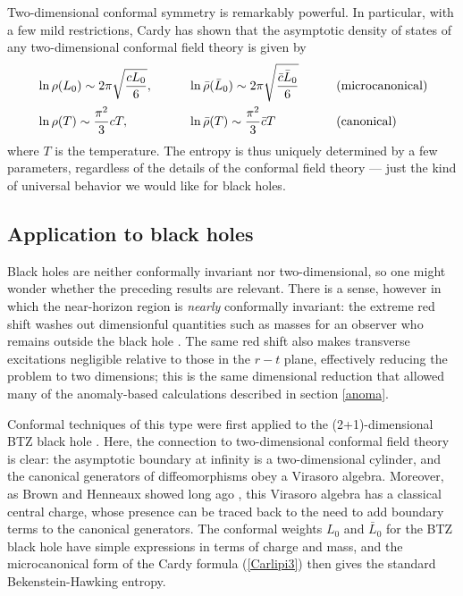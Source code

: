 \documentclass[12pt]{article}
\begin{document}
Two-dimensional conformal symmetry is remarkably powerful.  In particular,
with a few mild restrictions, Cardy has shown that the asymptotic density of
states of any two-dimensional conformal field theory is given by \cite{Cardy,Cardy2}
\begin{alignat}{5}
&\ln\rho(L_0) \sim 2\pi\sqrt{\frac{cL_0}{6}}, \qquad 
&&\ln{\bar\rho}({\bar L}_0) \sim 2\pi\sqrt{\frac{{\bar c}{\bar L}_0}{6}} \qquad
&&\hbox{(microcanonical)} \nonumber\\
&\ln\rho(T) \sim \frac{\pi^2}{3}cT, \qquad 
&&\ln{\bar\rho}(T) \sim \frac{\pi^2}{3}{\bar c}T
&&\hbox{(canonical)}
\label{Carlipi3}
\end{alignat}
where $T$ is the temperature.  The entropy is thus uniquely determined by a 
few parameters, regardless of the details of the conformal field theory --- just 
the kind of universal behavior we would like for black holes.

\subsection{Application to black holes}

Black holes are neither conformally invariant nor two-dimensional, so one
might wonder whether the preceding results are relevant. There is a sense,
however in which the near-horizon region is \emph{nearly}  conformally
 invariant: the extreme red shift washes out dimensionful quantities such
as masses for an observer who remains outside the black hole \cite{Camblong}.
The same red shift also makes transverse excitations negligible relative to 
those in the $r-t$ plane, effectively reducing the problem to two dimensions; 
this is the same dimensional reduction that allowed many of the anomaly-based
calculations described in section \ref{anoma}.

Conformal techniques of this type were first applied to the (2+1)-dimensional
BTZ black hole \cite{Strominger,BSS}.  Here, the connection to two-dimensional
conformal field theory is clear: the asymptotic boundary at infinity is a 
two-dimensional cylinder, and the canonical generators of diffeomorphisms
obey a Virasoro algebra.  Moreover, as Brown and Henneaux showed long
ago \cite{BrownHen}, this Virasoro algebra has a classical central charge,
whose presence can be traced back to the need to add boundary terms to
the canonical generators.  The conformal weights $L_0$ and ${\bar L}_0$ 
for the BTZ black hole have simple expressions in terms of charge and 
mass, and the microcanonical form of the Cardy formula (\ref{Carlipi3}) 
then gives the standard Bekenstein-Hawking entropy.
\end{document}
